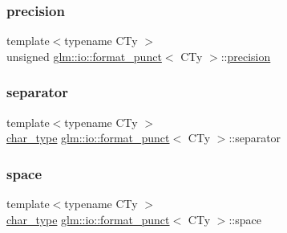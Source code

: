 \subsubsection{\texorpdfstring{precision}{precision}}
{\footnotesize\ttfamily template$<$typename C\+Ty $>$ \\
unsigned \hyperlink{classglm_1_1io_1_1format__punct}{glm\+::io\+::format\+\_\+punct}$<$ C\+Ty $>$\+::\hyperlink{structglm_1_1io_1_1precision}{precision}}

\mbox{\label{classglm_1_1io_1_1format__punct_ac561eb04fc2a1282ef38ea15f8e640ee}} 
\subsubsection{\texorpdfstring{separator}{separator}}
{\footnotesize\ttfamily template$<$typename C\+Ty $>$ \\
\hyperlink{classglm_1_1io_1_1format__punct_ae94c42484a4c5258ad7b2f0f029efdf3}{char\+\_\+type} \hyperlink{classglm_1_1io_1_1format__punct}{glm\+::io\+::format\+\_\+punct}$<$ C\+Ty $>$\+::separator}

\mbox{\label{classglm_1_1io_1_1format__punct_adf9a915938727793de1daca07dcdfa4e}} 
\subsubsection{\texorpdfstring{space}{space}}
{\footnotesize\ttfamily template$<$typename C\+Ty $>$ \\
\hyperlink{classglm_1_1io_1_1format__punct_ae94c42484a4c5258ad7b2f0f029efdf3}{char\+\_\+type} \hyperlink{classglm_1_1io_1_1format__punct}{glm\+::io\+::format\+\_\+punct}$<$ C\+Ty $>$\+::space}

\mbox{\label{classglm_1_1io_1_1format__punct_a95d32ca2330bbf7c50d3e066b7a851db}} 
